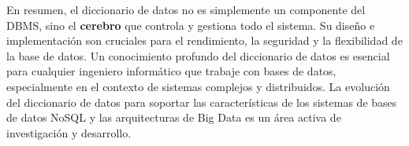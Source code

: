 \begin{itemize}
\end{itemize}

En resumen, el diccionario de datos no es simplemente un componente del DBMS, sino el \textbf{cerebro} que controla y gestiona todo el sistema.  Su diseño e implementación son cruciales para el rendimiento, la seguridad y la flexibilidad de la base de datos. Un conocimiento profundo del diccionario de datos es esencial para cualquier ingeniero informático que trabaje con bases de datos, especialmente en el contexto de sistemas complejos y distribuidos.  La evolución del diccionario de datos para soportar las características de los sistemas de bases de datos NoSQL y las arquitecturas de Big Data es un área activa de investigación y desarrollo.
